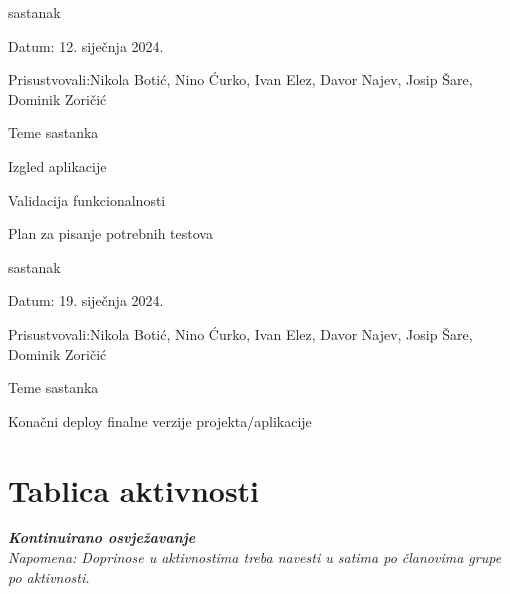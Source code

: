 \begin{packed_enum}
			\item  sastanak
			\item[] \begin{packed_item}
				\item Datum: 12. siječnja 2024.
				\item Prisustvovali:Nikola Botić, 
				Nino Ćurko, Ivan Elez,
				Davor Najev, Josip Šare,
				Dominik Zoričić
				\item Teme sastanka
				\begin{packed_item}
					\item  Izgled aplikacije
					\item Validacija funkcionalnosti
					\item Plan za pisanje potrebnih testova
				\end{packed_item}
			\end{packed_item}
			
			\item  sastanak
			\item[] \begin{packed_item}
				\item Datum: 19. siječnja 2024.
				\item Prisustvovali:Nikola Botić, 
				Nino Ćurko, Ivan Elez,
				Davor Najev, Josip Šare,
				Dominik Zoričić
				\item Teme sastanka
				\begin{packed_item}
					\item  Konačni deploy finalne verzije projekta/aplikacije
				\end{packed_item}
			\end{packed_item}
			
		\end{packed_enum}
		
		\eject
		\section*{Tablica aktivnosti}
		
			\textbf{\textit{Kontinuirano osvježavanje}}\\
			
			 \textit{Napomena: Doprinose u aktivnostima treba navesti u satima po članovima grupe po aktivnosti.}

